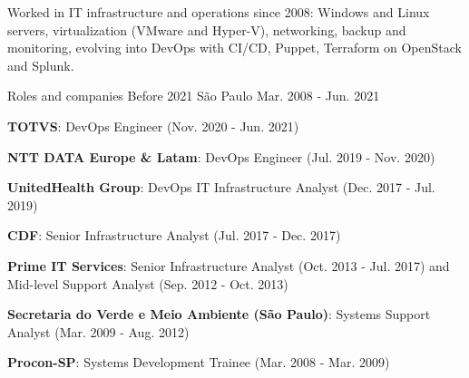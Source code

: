 \par\noindent\begin{minipage}{\textwidth}


\begin{cvparagraph}

Worked in IT infrastructure and operations since 2008: Windows and Linux servers, virtualization (VMware and Hyper-V), networking, backup and monitoring, evolving into DevOps with CI/CD, Puppet, Terraform on OpenStack and Splunk.

\end{cvparagraph}

\begin{cventries}

  \cventry
    {Roles and companies} %
    {Before 2021} %
    {São Paulo} %
    {Mar. 2008 - Jun. 2021} %
    {
      \begin{cvitems} %
        \item {\textbf{TOTVS}: DevOps Engineer (Nov. 2020 - Jun. 2021)}
        \item {\textbf{NTT DATA Europe \& Latam}: DevOps Engineer (Jul. 2019 - Nov. 2020)}
        \item {\textbf{UnitedHealth Group}: DevOps IT Infrastructure Analyst (Dec. 2017 - Jul. 2019)}
        \item {\textbf{CDF}: Senior Infrastructure Analyst (Jul. 2017 - Dec. 2017)}
        \item {\textbf{Prime IT Services}: Senior Infrastructure Analyst (Oct. 2013 - Jul. 2017) and Mid-level Support Analyst (Sep. 2012 - Oct. 2013)}
        \item {\textbf{Secretaria do Verde e Meio Ambiente (São Paulo)}: Systems Support Analyst (Mar. 2009 - Aug. 2012)}
        \item {\textbf{Procon-SP}: Systems Development Trainee (Mar. 2008 - Mar. 2009)}
      \end{cvitems}
    }
  \break

\end{cventries}
\end{minipage}\par

\vspace{\baselineskip}
